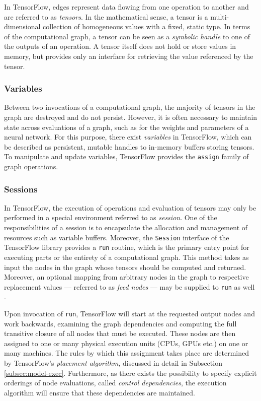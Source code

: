 In TensorFlow, edges represent data flowing from one operation to another and
are referred to as \emph{tensors}. In the mathematical sense, a tensor is a
multi-dimensional collection of homogeneous values with a fixed, static type. In
terms of the computational graph, a tensor can be seen as a \emph{symbolic
  handle} to one of the outputs of an operation. A tensor itself does not hold
or store values in memory, but provides only an interface for retrieving the
value referenced by the tensor.

\subsubsection{Variables}\label{sec:model-graphs-vars}

Between two invocations of a computational graph, the majority of tensors in the
graph are destroyed and do not persist. However, it is often necessary to
maintain state across evaluations of a graph, such as for the weights and
parameters of a neural network. For this purpose, there exist \emph{variables}
in TensorFlow, which can be described as persistent, mutable handles to
in-memory buffers storing tensors. To manipulate and update variables,
TensorFlow provides the \texttt{assign} family of graph operations.

\subsubsection{Sessions}\label{sec:model-graphs-sessions}

In TensorFlow, the execution of operations and evaluation of tensors may only be
performed in a special environment referred to as \emph{session}. One of the
responsibilities of a session is to encapsulate the allocation and management of
resources such as variable buffers. Moreover, the \texttt{Session} interface of
the TensorFlow library provides a \texttt{run} routine, which is the primary
entry point for executing parts or the entirety of a computational graph. This
method takes as input the nodes in the graph whose tensors should be computed
and returned. Moreover, an optional mapping from arbitrary nodes in the graph to
respective replacement values --- referred to as \emph{feed nodes} --- may be
supplied to \texttt{run} as well \cite{tensorflow}.

Upon invocation of \texttt{run}, TensorFlow will start at the requested output
nodes and work backwards, examining the graph dependencies and computing the
full transitive closure of all nodes that must be executed. These nodes are then
assigned to one or many physical execution units (CPUs, GPUs etc.) on one or
many machines. The rules by which this assignment takes place are determined by
TensorFlow's \emph{placement algorithm}, discussed in detail in Subsection
\ref{subsec:model-exec}. Furthermore, as there exists the possibility to specify
explicit orderings of node evaluations, called \emph{control dependencies}, the
execution algorithm will ensure that these dependencies are maintained.

